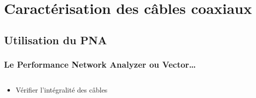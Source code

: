 \documentclass[10pt,a9paper,handout]{beamer} \usepackage[utf8]{inputenc} \usepackage[francais]{babel} \usepackage[T1]{fontenc}
\begin{document}
\section{Caractérisation des câbles coaxiaux}
\subsection{Utilisation du PNA}
\begin{frame}
\frametitle{Le Performance Network Analyzer \tiny{ ou Vector…} }
\begin{columns}
\begin{column}{0.6\textwidth}
    \begin{itemize}
        \item Vérifier l'intégralité des câbles\\
                

\end{itemize}
\end{column}
\end{columns}
\end{frame}
\end{document}
